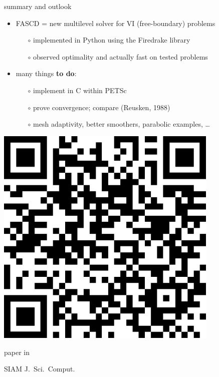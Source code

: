 \documentclass[svgnames,
               hyperref={colorlinks,citecolor=DeepPink4,linkcolor=FireBrick,urlcolor=Maroon},
               usepdftitle=false]  %
               {beamer}
\begin{document}
\begin{frame}{summary and outlook}

\begin{itemize}
\item FASCD = new multilevel solver for VI (free-boundary) problems
    \begin{itemize}
    \item[$\circ$] implemented in Python using the Firedrake library
    \item[$\circ$] observed optimality and actually fast on tested problems
    \end{itemize}
\item many things \textbf{{\color{FireBrick} to do}}:
    \begin{itemize}
    \item[$\circ$] implement in C within PETSc
    \item[$\circ$] prove convergence; compare (Reusken, 1988)
    \item[$\circ$] mesh adaptivity, better smoothers, parabolic examples, \dots
    \end{itemize}
\end{itemize}

\bigskip\bigskip
\begin{minipage}[T]{0.25\textwidth}
\vspace{0pt}

\includegraphics[width=0.8\textwidth]{figs/QRbuelerfarrell.png}

\scriptsize paper in

SIAM J.~Sci.~Comput.
\end{minipage}
\hfill
\begin{minipage}[T]{0.25\textwidth}
\vspace{0pt}


\end{minipage}
\end{frame}
\end{document}
